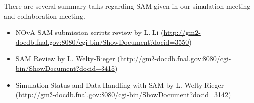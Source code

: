 There are several summary talks regarding SAM given in our simulation meeting and collaboration meeting.
\begin{itemize}
\item NOvA SAM submission scripts review by L. Li 
(\url{http://gm2-docdb.fnal.gov:8080/cgi-bin/ShowDocument?docid=3550})
\item SAM Review by L. Welty-Rieger (\url{http://gm2-docdb.fnal.gov:8080/cgi-bin/ShowDocument?docid=3415})
\item Simulation Status and Data Handling with SAM by L. Welty-Rieger (\url{http://gm2-docdb.fnal.gov:8080/cgi-bin/ShowDocument?docid=3142)}
\end{itemize}



